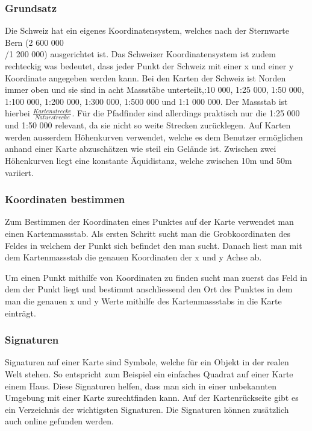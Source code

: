\subsubsection{Grundsatz}
Die Schweiz hat ein eigenes Koordinatensystem, welches nach der Sternwarte Bern (2 600 000 \\/1 200 000) ausgerichtet ist. Das Schweizer Koordinatensystem ist zudem rechteckig was bedeutet, dass jeder Punkt der Schweiz mit einer x und einer y Koordinate angegeben werden kann. Bei den Karten der Schweiz ist Norden immer oben und sie sind in acht Massstäbe unterteilt,:10 000, 1:25 000, 1:50 000, 1:100 000, 1:200 000, 1:300 000, 1:500 000 und 1:1 000 000. Der Massstab ist hierbei $\frac{Kartenstrecke}{Naturstrecke}$. Für die Pfadfinder sind allerdings praktisch nur die 1:25 000 und 1:50 000 relevant, da sie nicht so weite Strecken zurücklegen. Auf Karten werden ausserdem Höhenkurven verwendet, welche es dem Benutzer ermöglichen anhand einer Karte abzuschätzen wie steil ein Gelände ist. Zwischen zwei Höhenkurven liegt eine konstante Äquidistanz, welche zwischen 10m und 50m variiert. 

\subsubsection{Koordinaten bestimmen}
Zum Bestimmen der Koordinaten eines Punktes auf der Karte verwendet man einen Kartenmassstab. Als ersten Schritt sucht man die Grobkoordinaten des Feldes in welchem der Punkt sich befindet den man sucht. Danach liest man mit dem Kartenmassstab die genauen Koordinaten der x und y Achse ab. \par Um einen Punkt mithilfe von Koordinaten zu finden sucht man zuerst das Feld in dem der Punkt liegt und bestimmt anschliessend den Ort des Punktes in dem man die genauen x und y Werte mithilfe des Kartenmassstabs in die Karte einträgt.

\subsubsection{Signaturen}

Signaturen auf einer Karte sind Symbole, welche für ein Objekt in der realen Welt stehen. So entspricht zum Beispiel ein einfaches Quadrat auf einer Karte einem Haus. Diese Signaturen helfen, dass man sich in einer unbekannten Umgebung mit einer Karte zurechtfinden kann. Auf der Kartenrückseite gibt es ein Verzeichnis der wichtigsten Signaturen. Die Signaturen können zusätzlich auch online gefunden werden\cite{oa_zeichenerklarung_nodate}.

